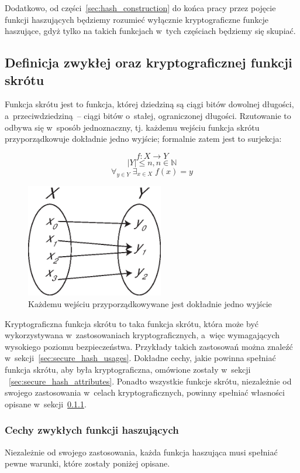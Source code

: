 Dodatkowo, od części~\ref{sec:hash_construction} do końca pracy przez pojęcie
funkcji haszujących będziemy rozumieć wyłącznie kryptograficzne funkcje
haszujące, gdyż tylko na takich funkcjach w~tych częściach będziemy się
skupiać.
\pagebreak



\subsection{Definicja zwykłej oraz kryptograficznej funkcji skrótu}
Funkcja skrótu jest to funkcja, której dziedziną są ciągi bitów dowolnej
długości, a~przeciwdziedziną~-- ciągi bitów o~stałej, ograniczonej długości.
Rzutowanie to odbywa się w~sposób jednoznaczny, tj. każdemu wejściu funkcja
skrótu przyporządkowuje dokładnie jedno wyjście; formalnie zatem jest to
surjekcja:

$$ f \colon X \to Y $$
$$ |Y| \leq n, n \in \mathbb{N} $$
$$ \forall_{y \in Y} \; \exists_{x \in X} \; f(x)=y $$

\begin{figure}[htb!]
    \includegraphics[width=6cm]{img/surjection.eps}
    \caption{Każdemu wejściu przyporządkowywane jest dokładnie jedno wyjście}
    \label{fig:surjection}
\end{figure}

Kryptograficzna funkcja skrótu to taka funkcja skrótu, która może być
wykorzystywana w~zastosowaniach kryptograficznych, a~więc wymagających
wysokiego poziomu bezpieczeństwa. Przykłady takich zastosowań można znaleźć
w~sekcji~\ref{sec:secure_hash_usages}. Dokładne cechy, jakie powinna spełniać
funkcja skrótu, aby była kryptograficzna, omówione zostały w~sekcji
~\ref{sec:secure_hash_attributes}. Ponadto wszystkie funkcje skrótu,
niezależnie od swojego zastosowania w~celach kryptograficznych, powinny
spełniać własności opisane w~sekcji~\ref{sec:common_hash_attributes}.



\subsubsection{Cechy zwykłych funkcji haszujących}
\label{sec:common_hash_attributes}
Niezależnie od swojego zastosowania, każda funkcja haszująca musi spełniać
pewne warunki, które zostały poniżej opisane.

